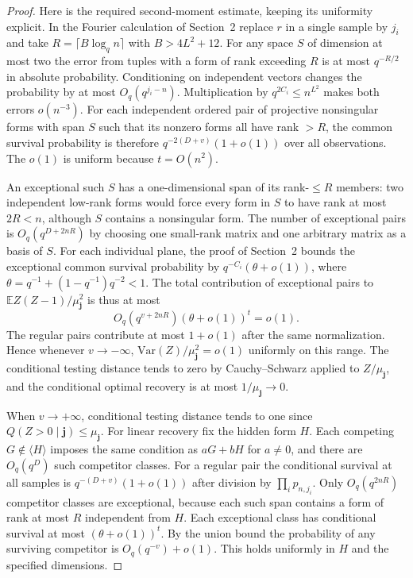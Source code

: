 \documentclass[11pt]{article}
\newcommand{\E}{\mathbb E}
\begin{document}
\begin{proof}
Here is the required second-moment estimate, keeping its uniformity explicit. In the Fourier calculation of Section~2 replace $r$ in a single sample by $j_i$ and take $R=\lceil B\log_q n\rceil$ with $B>4L^2+12$. For any space $S$ of dimension at most two the error from tuples with a form of rank exceeding $R$ is at most $q^{-R/2}$ in absolute probability. Conditioning on independent vectors changes the probability by at most $O_q(q^{j_i-n})$. Multiplication by $q^{2C_i}\le n^{L^2}$ makes both errors $o(n^{-3})$. For each independent ordered pair of projective nonsingular forms with span $S$ such that its nonzero forms all have rank $>R$, the common survival probability is therefore $q^{-2(D+v)}(1+o(1))$ over all observations. The $o(1)$ is uniform because $t=O(n^2)$.

An exceptional such $S$ has a one-dimensional span of its rank-$\le R$ members: two independent low-rank forms would force every form in $S$ to have rank at most $2R<n$, although $S$ contains a nonsingular form. The number of exceptional pairs is $O_q(q^{D+2nR})$ by choosing one small-rank matrix and one arbitrary matrix as a basis of $S$. For each individual plane, the proof of Section~2 bounds the exceptional common survival probability by $q^{-C_i}(\theta+o(1))$, where $\theta=q^{-1}+(1-q^{-1})q^{-2}<1$. The total contribution of exceptional pairs to $\E Z(Z-1)/\mu_{\boldsymbol j}^2$ is thus at most
\[
 O_q(q^{v+2nR})(\theta+o(1))^t=o(1).
\]
The regular pairs contribute at most $1+o(1)$ after the same normalization. Hence whenever $v\to-\infty$, $\mathrm{Var}(Z)/\mu_{\boldsymbol j}^2=o(1)$ uniformly on this range. The conditional testing distance tends to zero by Cauchy--Schwarz applied to $Z/\mu_{\boldsymbol j}$, and the conditional optimal recovery is at most $1/\mu_{\boldsymbol j}\to0$.

When $v\to+\infty$, conditional testing distance tends to one since $Q(Z>0\mid\boldsymbol j)\le\mu_{\boldsymbol j}$. For linear recovery fix the hidden form $H$. Each competing $G\notin\langle H\rangle$ imposes the same condition as $aG+bH$ for $a\ne0$, and there are $O_q(q^D)$ such competitor classes. For a regular pair the conditional survival at all samples is $q^{-(D+v)}(1+o(1))$ after division by $\prod_i p_{n,j_i}$. Only $O_q(q^{2nR})$ competitor classes are exceptional, because each such span contains a form of rank at most $R$ independent from $H$. Each exceptional class has conditional survival at most $(\theta+o(1))^t$. By the union bound the probability of any surviving competitor is $O_q(q^{-v})+o(1)$. This holds uniformly in $H$ and the specified dimensions.


\end{proof}
\end{document}
